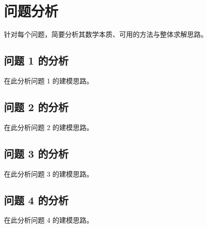 \section{问题分析}

针对每个问题，简要分析其数学本质、可用的方法与整体求解思路。

\subsection{问题 1 的分析}
在此分析问题 1 的建模思路。

\subsection{问题 2 的分析}
在此分析问题 2 的建模思路。

\subsection{问题 3 的分析}
在此分析问题 3 的建模思路。

\subsection{问题 4 的分析}
在此分析问题 4 的建模思路。
